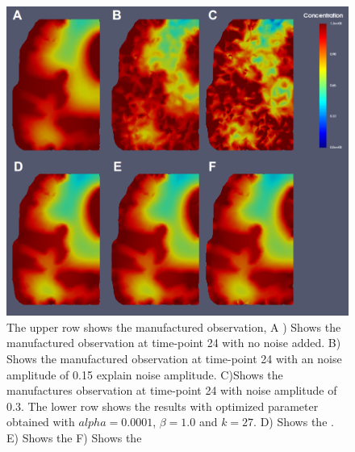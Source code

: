 \documentclass[11pt,a4paper]{article}
\begin{document}
\begin{figure}
\centering
\includegraphics[scale=0.4]{27-12-hours-scale-0-1-3.png}  
\caption{The upper row shows the manufactured observation, A ) Shows the manufactured observation at time-point 24 with no noise added. B) Shows the manufactured observation at time-point 24 with an noise amplitude of 0.15 {\color{red} explain noise amplitude}. C)Shows the manufactures observation at time-point 24 with noise amplitude of 0.3. The lower row shows the results with optimized parameter obtained with $alpha=0.0001$, $\beta=1.0$ and $k=27$. D) Shows the  . E)  Shows the  F)  Shows the  }
\end{figure}
\end{document}

